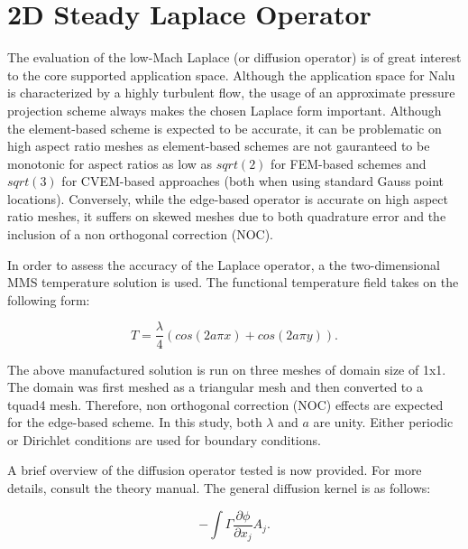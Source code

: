 \section{2D Steady Laplace Operator}
The evaluation of the low-Mach Laplace (or diffusion operator) is of great interest to the core supported application
space. Although the application space for Nalu is characterized by a highly turbulent flow, the usage of an approximate 
pressure projection scheme always makes the chosen Laplace form important. Although the element-based scheme is expected 
to be accurate, it can be problematic on high aspect ratio meshes as element-based schemes are not gauranteed to be monotonic 
for aspect ratios as low as $sqrt(2)$ for FEM-based schemes and $sqrt(3)$ for CVEM-based approaches (both when using standard 
Gauss point locations). Conversely, while the edge-based operator is accurate on high aspect ratio meshes, it suffers on skewed 
meshes due to both quadrature error and the inclusion of a non orthogonal correction (NOC). 

In order to assess the accuracy of the Laplace operator, a the two-dimensional MMS temperature solution 
is used. The functional temperature field takes on the following form:

\begin{equation}
  T = \frac{\lambda}{4} (cos(2 a \pi x) + cos(2 a \pi y)).
\label{advConvTV_u}
\end{equation}

The above manufactured solution is run on three meshes of domain size of 1x1. The domain was first meshed as a triangular mesh and
then converted to a tquad4 mesh. Therefore, non orthogonal correction (NOC) effects are expected for the edge-based scheme. 
In this study, both $\lambda$ and $a$ are unity. Either periodic or Dirichlet conditions are used for boundary conditions. 


A brief overview of the diffusion operator tested is now provided. For more details, consult the theory manual. The general 
diffusion kernel is as follows:

\begin{equation}
 -\int \Gamma \frac{\partial \phi}{\partial x_j} A_j.
\label{diffOp}
\end{equation}

